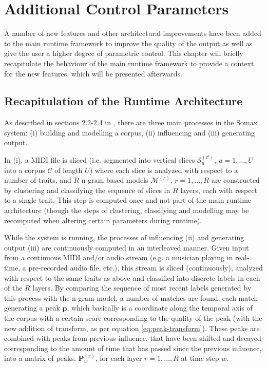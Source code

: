 \section{Additional Control Parameters}\label{sec:model-improvements}
A number of new features and other architectural improvements have been added to the main runtime framework to improve the quality of the output as well as give the user a higher degree of parametric control. This chapter will briefly recapitulate the behaviour of the main runtime framework to provide a context for the new features, which will be presented afterwards.

\subsection{Recapitulation of the Runtime Architecture}\label{ssec:runtime-recap}
As described in sections 2.2-2.4 in \cite{borg2020dynamic}, there are three main processes in the Somax system: (i) building and modelling a corpus, (ii) influencing and (iii) generating output. 

In (i), a MIDI file is sliced (i.e. segmented into vertical slices $\mathcal S^{(\mathcal C)}_u$, $u=1,\dots,U$ into a corpus $\mathcal C$ of length $U$) where each slice is analyzed with respect to a number of traits, and $R$ n-gram-based models $\mathcal M^{(r)}$, $r=1,\dots,R$ are constructed by clustering and classifying the sequence of slices in $R$ layers, each with respect to a single trait. This step is computed once and not part of the main runtime architecture (though the steps of clustering, classifying and modelling may be recomputed when altering certain parameters during runtime).

While the system is running, the processes of influencing (ii) and generating output (iii) are continuously computed in an interleaved manner. Given input from a continuous MIDI and/or audio stream (e.g. a musician playing in real-time, a pre-recorded audio file, etc.), this stream is sliced (continuously), analyzed with respect to the same traits as above and classified into discrete labels in each of the $R$ layers. By comparing the sequence of most recent labels generated by this process with the n-gram model, a number of matches are found, each match generating a peak $\bm p$, which basically is a coordinate along the temporal axis of the corpus with a certain score corresponding to the quality of the peak (with the new addition of transform, as per equation \ref{eq:peak-transform}). These peaks are combined with peaks from previous influence, that have been shifted and decayed corresponding to the amount of time that has passed since the previous influence, into a matrix of peaks, $\bm P^{(r)}_w$, for each layer $r = 1,\dots,R$ at time step $w$.

